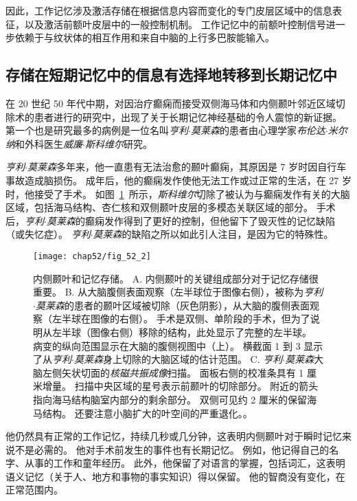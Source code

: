 因此，工作记忆涉及激活存储在根据信息内容而变化的专门皮层区域中的信息表征，以及激活前额叶皮层中的一般控制机制。
工作记忆中的前额叶控制信号进一步依赖于与纹状体的相互作用和来自中脑的上行多巴胺能输入。



\subsection{存储在短期记忆中的信息有选择地转移到长期记忆中}

在 20 世纪 50 年代中期，对因治疗癫痫而接受双侧海马体和内侧颞叶邻近区域切除术的患者进行的研究中，出现了关于长期记忆神经基础的令人震惊的新证据。
第一个也是研究最多的病例是一位名叫\textit{亨利$\cdot$莫莱森}的患者由心理学家\textit{布伦达$\cdot$米尔纳}和外科医生\textit{威廉$\cdot$斯科维尔}研究。


\textit{亨利$\cdot$莫莱森}多年来，他一直患有无法治愈的颞叶癫痫，其原因是 7 岁时因自行车事故造成脑损伤。
成年后，他的癫痫发作使他无法工作或过正常的生活，在 27 岁时，他接受了手术。
如图~\ref{fig:52_2}~所示，\textit{斯科维尔}切除了被认为与癫痫发作有关的大脑区域，包括海马结构、杏仁核和双侧颞叶皮层的多模态关联区域的部分。
手术后，\textit{亨利$\cdot$莫莱森}的癫痫发作得到了更好的控制，但他留下了毁灭性的记忆缺陷（或失忆症）。
\textit{亨利$\cdot$莫莱森}的缺陷之所以如此引人注目，是因为它的特殊性。


\begin{figure}[htbp]
	\centering
	\texttt{[image: chap52/fig\_52\_2]}
	\caption{内侧颞叶和记忆存储。
		A. 内侧颞叶的关键组成部分对于记忆存储很重要。
		B. 从大脑腹侧表面观察（左半球位于图像右侧），被称为\textit{亨利$\cdot$莫莱森}的患者的颞叶区域被切除（灰色阴影），从大脑的腹侧表面观察（左半球在图像的右侧）。
		手术是双侧、单阶段的手术，但为了说明从左半球（图像右侧）移除的结构，此处显示了完整的左半球。
		病变的纵向范围显示在大脑的腹侧视图中（上）。
		横截面 1 到 3 显示了从\textit{亨利$\cdot$莫莱森}身上切除的大脑区域的估计范围\cite{corkin1997hm}。
		C. \textit{亨利$\cdot$莫莱森}大脑左侧矢状切面的\textit{核磁共振成像}扫描。
		面板右侧的校准条具有 1 厘米增量。
		扫描中央区域的星号表示前颞叶的切除部分。
		附近的箭头指向海马结构脑室内部分的剩余部分。
		双侧可见约 2 厘米的保留海马结构。
		还要注意小脑扩大的叶空间的严重退化。\cite{corkin1997hm}。}
	\label{fig:52_2}
\end{figure}


他仍然具有正常的工作记忆，持续几秒或几分钟，这表明内侧颞叶对于瞬时记忆来说不是必需的。
他对手术前发生的事件也有长期记忆。
例如，他记得自己的名字、从事的工作和童年经历。
此外，他保留了对语言的掌握，包括词汇，这表明语义记忆（关于人、地方和事物的事实知识）得以保留。
他的智商没有变化，在正常范围内。


